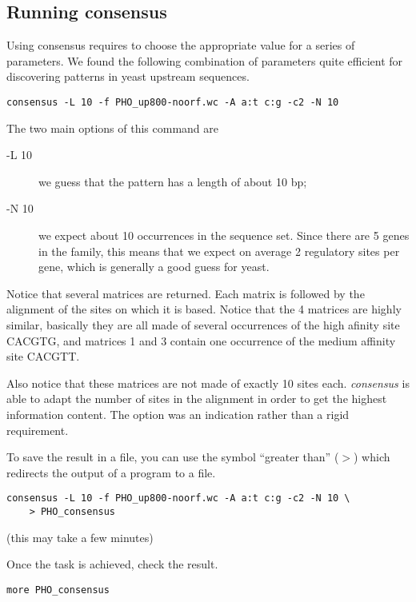 \subsection{Running consensus}

Using consensus requires to choose the appropriate value for a series
of parameters. We found the following combination of parameters quite
efficient for discovering patterns in yeast upstream sequences.

{\color{Blue} \begin{footnotesize} 
\begin{verbatim}
consensus -L 10 -f PHO_up800-noorf.wc -A a:t c:g -c2 -N 10
\end{verbatim} \end{footnotesize}
}


The two main options of this command are 

\begin{description}
\item[-L 10] we guess that the pattern has a length of about 10 bp;

\item[-N 10] we expect about 10 occurrences in the sequence set. Since
there are 5 genes in the family, this means that we expect on average
2 regulatory sites per gene, which is generally a good guess for
yeast.

\end{description}

Notice that several matrices are returned. Each matrix is followed by
the alignment of the sites on which it is based. Notice that the 4
matrices are highly similar, basically they are all made of several
occurrences of the high afinity site CACGTG, and matrices 1 and 3
contain one occurrence of the medium affinity site CACGTT. 

Also notice that these matrices are not made of exactly 10 sites
each. \textit{consensus} is able to adapt the number of sites in the
alignment in order to get the highest information content. The option
 was an indication rather than a rigid requirement.

To save the result in a file, you can use the symbol ``greater than''
($>$) which redirects the output of a program to a file.

{\color{Blue} \begin{footnotesize} 
\begin{verbatim}
consensus -L 10 -f PHO_up800-noorf.wc -A a:t c:g -c2 -N 10 \
    > PHO_consensus
\end{verbatim} \end{footnotesize}
}


(this may take a few minutes)

Once the task is achieved, check the result.

{\color{Blue} \begin{footnotesize} 
\begin{verbatim}
more PHO_consensus
\end{verbatim} \end{footnotesize}
}

